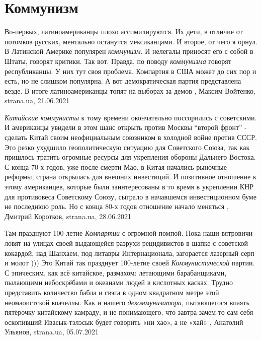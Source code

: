  
 
 
 
 
\chapter{Коммунизм}
\label{sec:slova.kommunizm}

Во-первых, латиноамериканцы плохо ассимилируются. Их дети, в отличие от
потомков русских, ментально останутся мексиканцами. И второе, от чего я орнул.
В Латинской Америке популярен \emph{коммунизм}. И нелегалы приносят его с собой
в Штаты, говорят критики. Так вот. Правда, по поводу \emph{коммунизма} говорят
республиканцы. У них тут своя проблема. Компартия в США может до сих пор и
есть, но не слишком популярна. А вот демократическая партия представлена везде.
В итоге латиноамериканцы топят на выборах за демов
, 
Максим Войтенко, strana.ua, 21.06.2021


\emph{Китайские коммунисты} к тому времени окончательно поссорились с советскими. И
американцы увидели в этом шанс открыть против Москвы \enquote{второй фронт} - сделать
Китай своим неофициальным союзником в холодной войне против СССР. Это резко
ухудшило геополитическую ситуацию для Советского Союза, так как пришлось
тратить огромные ресурсы для укрепления обороны Дальнего Востока.  С конца 70-х
годов, уже после смерти Мао, в Китая начались рыночные реформы, страна
открылась для внешних инвестиций. И позитивное отношение к этому американцев,
которые были заинтересованы в то время в укреплении КНР для противовеса
Советскому Союзу, сыграло в начавшемся инвестиционном буме не последнюю роль.
Но с конца 80-х годов отношение начало меняться
, 
Дмитрий Коротков, strana.ua, 28.06.2021

Там празднуют 100-летие \emph{Компартии} с огромной помпой.
Пока наши вятровичи ловят на улицах своей выдающейся разрухи рецидивистов в
шапке с советской кокардой, над Шанхаем, под литавры Интернационала, загорается
лазерный серп и молот ))) Это Китай так празднует 100-летие своей
\emph{Коммунистической} партии. С эпическим, как всё китайское, размахом: летающими
барабанщиками, пылающими небоскрёбами и океанами людей в кислотных касках.
Трудно представить количество бабла и свэга в одном квадратном метре этой
неомаоистской коачеллы. Как и нашего \emph{декоммунизатора}, пытающегося впаять
пятёрочку китайскому камраду, и не понимающего, что завтра зачем-то сам себя
оскопивший Ивасык-тэлэсык будет говорить «ни хао», а не «хай»
, 
Анатолий Ульянов, strana.ua, 05.07.2021

